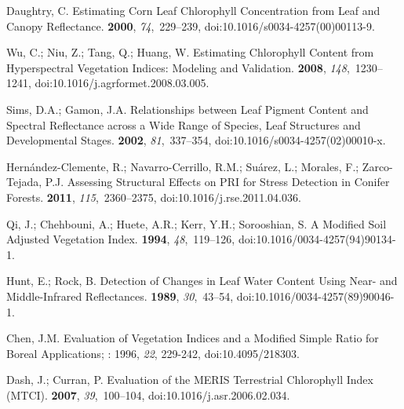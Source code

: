 \documentclass[remotesensing,article,accept,moreauthors,pdftex]{Definitions/mdpi}
\begin{document}
\begin{thebibliography}{999}
Daughtry, C.
\newblock Estimating {{Corn Leaf Chlorophyll Concentration}} from {{Leaf}} and
  {{Canopy Reflectance}}.
 {\bf 2000}, {\em 74},~229--239, doi:10.1016/s0034-4257(00)00113-9.

Wu, C.; Niu, Z.; Tang, Q.; Huang, W.
\newblock Estimating Chlorophyll Content from Hyperspectral Vegetation Indices:
  Modeling and Validation.
 {\bf 2008}, {\em
  148},~1230--1241, doi:10.1016/j.agrformet.2008.03.005.

Sims, D.A.; Gamon, J.A.
\newblock Relationships between Leaf Pigment Content and Spectral Reflectance
  across a Wide Range of Species, Leaf Structures and Developmental Stages.
 {\bf 2002}, {\em 81},~337--354, doi:10.1016/s0034-4257(02)00010-x.

{Hern{\'a}ndez-Clemente}, R.; {Navarro-Cerrillo}, R.M.; Su{\'a}rez, L.;
  Morales, F.; {Zarco-Tejada}, P.J.
\newblock Assessing Structural Effects on {{PRI}} for Stress Detection in
  Conifer Forests.
 {\bf 2011}, {\em
  115},~2360--2375, doi:10.1016/j.rse.2011.04.036.

Qi, J.; Chehbouni, A.; Huete, A.R.; Kerr, Y.H.; Sorooshian, S.
\newblock A Modified Soil Adjusted Vegetation Index.
 {\bf 1994}, {\em 48},~119--126, doi:10.1016/0034-4257(94)90134-1.

Hunt, E.; Rock, B.
\newblock Detection of Changes in Leaf Water Content Using {{Near}}- and
  {{Middle}}-{{Infrared}} Reflectances.
 {\bf 1989}, {\em 30},~43--54, doi:10.1016/0034-4257(89)90046-1.

Chen, J.M.
\newblock Evaluation of Vegetation Indices and a {{Modified Simple Ratio}} for
  Boreal Applications;
:  1996, \emph{22}, 229-242, doi:10.4095/218303.

Dash, J.; Curran, P.
\newblock Evaluation of the {{MERIS}} Terrestrial Chlorophyll Index ({{MTCI}}).
 {\bf 2007}, {\em 39},~100--104, doi:10.1016/j.asr.2006.02.034.


\end{thebibliography}
\end{document}
